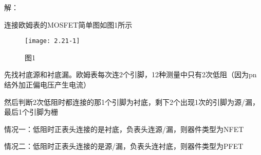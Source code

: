 






解：

连接欧姆表的MOSFET简单图如图1所示

\begin{figure}[H] %
	\begin{minipage}{\linewidth}
		\texttt{[image: 2.21-1]}
	\end{minipage}
	\caption*{图1} %
\end{figure}

先找衬底源和衬底漏。欧姆表每次连2个引脚，12种测量中只有2次低阻（因为pn结外加正偏电压产生电流）

然后判断2次低阻时都连接的那1个引脚为衬底，剩下2个出现1次的引脚为源/漏，最后1个引脚为栅

情况一：低阻时正表头连接的是衬底，负表头连源/漏，则器件类型为NFET

情况二：低阻时正表头连接的是源/漏，负表头连衬底，则器件类型为PFET


























%
